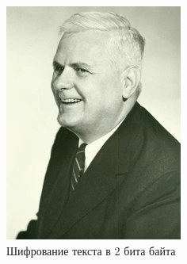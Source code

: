 \documentclass[10pt,a4paper,final]{article} %
\begin{document}
\begin{figure}[h!]
\begin{minipage}{0.3\textwidth}
		\includegraphics[width=\linewidth]{img/Haskell_2}
		\caption{Шифрование текста в 2 бита байта}
	\end{minipage}
\end{figure}
\end{document}
